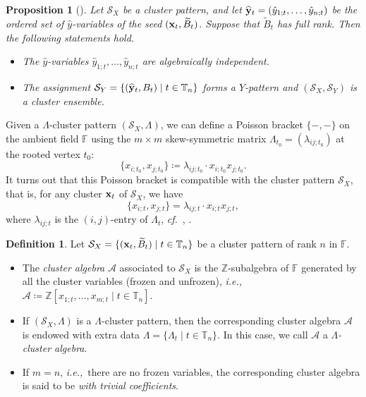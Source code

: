 \documentclass[12pt]{amsart}
\newtheorem{proposition}[theorem]{Proposition}
\theoremstyle{definition}
\newtheorem{definition}[theorem]{Definition}
\theoremstyle{remark}
\numberwithin{equation}{section}
\newcommand{\ie}{\textit{i.e.,}\ }
\newcommand{\confer}{\textit{cf.}\ }
\begin{document}
\begin{proposition}[{\cite[Proposition 3.9]{fomin_zelevinsky_2007}}] \label{pro:p-map}
Let $\mathcal S_X$ be a cluster pattern, and let $\widehat {\bf y}_t=(\hat y_{1;t},\ldots,\hat y_{n;t})$ be the ordered set of $\hat y$-variables of the seed $({\bf x}_t,\widetilde B_t)$. Suppose that  $\widetilde B_t$ has full rank. Then the following statements hold.
\begin{itemize}
    \item [(i)] The $\hat y$-variables $\hat y_{1;t},\ldots,\hat y_{n;t}$ are algebraically independent.
    \item [(ii)] The assignment $\mathcal S_Y=\{(\widehat {\bf y}_t, B_t)\mid t\in\mathbb T_n\}$ forms a $Y$-pattern and $(\mathcal S_X,\mathcal S_Y)$ is a cluster ensemble.
\end{itemize}

    
\end{proposition}

Given a $\mathsf{\Lambda}$-cluster pattern $(\mathcal S_X, \mathsf{\Lambda})$, we can define a Poisson bracket $\{-,-\}$ on the ambient field $\mathbb F$ using the $m\times m$ skew-symmetric matrix $\Lambda_{t_0}=(\lambda_{ij;t_0})$ at the rooted vertex $t_0$:
$$\{x_{i;t_0},x_{j;t_0}\} \coloneqq   \lambda_{ij;t_0}\cdot x_{i;t_0}x_{j;t_0}.$$
It turns out that this Poisson bracket is compatible with the cluster pattern $\mathcal S_X$, that is, for any cluster ${\bf x}_t$ of $\mathcal S_X$, we have $$\{x_{i;t},x_{j;t}\}=\lambda_{ij;t}\cdot x_{i;t}x_{j;t},$$
where $\lambda_{ij;t}$ is the $(i,j)$-entry of $\Lambda_t$, \confer \cite{gsv-2003}, \cite[Remark 4.6]{bz-2005}. 


\begin{definition}
 Let $\mathcal S_X=\{({\bf x}_t, \widetilde B_t)\mid t\in \mathbb T_n\}$ be a cluster pattern of rank $n$ in $\mathbb F$.
\begin{itemize}
    \item [(i)]  The {\em cluster algebra} $\mathcal A$ associated to $\mathcal S_X$ is the $\mathbb Z$-subalgebra of $\mathbb F$ generated by all the cluster variables (frozen and unfrozen), \ie $\mathcal A \coloneqq   \mathbb Z[x_{1;t},\ldots,x_{m;t}\mid t\in\mathbb T_n]$. 
    
    \item[(ii)]  If $(\mathcal S_X, \mathsf{\Lambda})$ is a  $\mathsf{\Lambda}$-cluster pattern, then the corresponding  cluster algebra $\mathcal A$ 
    is endowed with extra data $\mathsf{\Lambda}=\{\Lambda_t\mid t\in\mathbb T_n\}$. In this case, we call $\mathcal A$  a {\em $\mathsf{\Lambda}$-cluster algebra}.
    \item[(iii)] If $m=n$,  \ie there are no frozen variables, the corresponding  cluster algebra is said to be {\em with trivial coefficients}.  
\end{itemize}
\end{definition}
\end{document}
